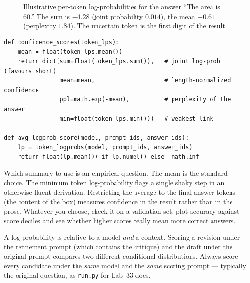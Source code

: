 \begin{figure}[t]
\centering
{}
\caption{Illustrative per-token log-probabilities for the answer ``The area is 60.'' The sum is
$-4.28$ (joint probability $0.014$), the mean $-0.61$ (perplexity $1.84$). The uncertain token is the
first digit of the result.}
\label{fig:refine:pertoken}
\end{figure}

\begin{lstlisting}[caption={Confidence summaries from token log-probabilities (Lab 33, Task 3).},label={lst:refine:conf}]
def confidence_scores(token_lps):
    mean = float(token_lps.mean())
    return dict(sum=float(token_lps.sum()),   # joint log-prob (favours short)
                mean=mean,                    # length-normalized confidence
                ppl=math.exp(-mean),          # perplexity of the answer
                min=float(token_lps.min()))   # weakest link

def avg_logprob_score(model, prompt_ids, answer_ids):
    lp = token_logprobs(model, prompt_ids, answer_ids)
    return float(lp.mean()) if lp.numel() else -math.inf
\end{lstlisting}

Which summary to use is an empirical question. The mean is the standard choice. The minimum token
log-probability flags a single shaky step in an otherwise fluent derivation. Restricting the average
to the final-answer tokens (the content of the box) measures confidence in the result rather than in
the prose. Whatever you choose, check it on a validation set: plot accuracy against score deciles and
see whether higher scores really mean more correct answers.

\begin{pitfall}
A log-probability is relative to a model \emph{and} a context. Scoring a revision under the
refinement prompt (which contains the critique) and the draft under the original prompt compares
two different conditional distributions. Always score every candidate under the \emph{same} model
and the \emph{same} scoring prompt --- typically the original question, as \texttt{run.py} for Lab~33
does.
\end{pitfall}


